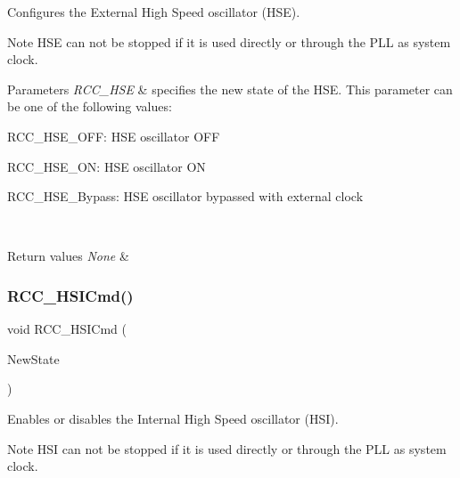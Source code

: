 Configures the External High Speed oscillator (H\+SE). 

\begin{DoxyNote}{Note}
H\+SE can not be stopped if it is used directly or through the P\+LL as system clock. 
\end{DoxyNote}

\begin{DoxyParams}{Parameters}
{\em R\+C\+C\+\_\+\+H\+SE} & specifies the new state of the H\+SE. This parameter can be one of the following values\+: \begin{DoxyItemize}
\item R\+C\+C\+\_\+\+H\+S\+E\+\_\+\+O\+FF\+: H\+SE oscillator O\+FF \item R\+C\+C\+\_\+\+H\+S\+E\+\_\+\+ON\+: H\+SE oscillator ON \item R\+C\+C\+\_\+\+H\+S\+E\+\_\+\+Bypass\+: H\+SE oscillator bypassed with external clock \end{DoxyItemize}
\\
\hline
\end{DoxyParams}

\begin{DoxyRetVals}{Return values}
{\em None} & \\
\hline
\end{DoxyRetVals}
\mbox{\label{group___r_c_c___private___functions_ga0c6772a1e43765909495f57815ef69e2}} 
\subsubsection{\texorpdfstring{RCC\_HSICmd()}{RCC\_HSICmd()}}
{\footnotesize\ttfamily void R\+C\+C\+\_\+\+H\+S\+I\+Cmd (\begin{DoxyParamCaption}\item[{\mbox{\hyperlink{group___exported__types_gac9a7e9a35d2513ec15c3b537aaa4fba1}{Functional\+State}}}]{New\+State }\end{DoxyParamCaption})}



Enables or disables the Internal High Speed oscillator (H\+SI). 

\begin{DoxyNote}{Note}
H\+SI can not be stopped if it is used directly or through the P\+LL as system clock. 
\end{DoxyNote}

